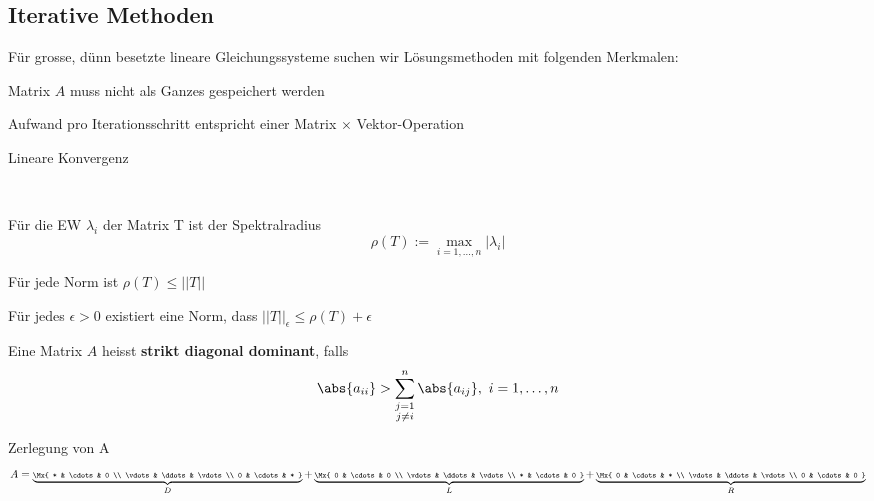 	\subsection{Iterative Methoden}
		Für grosse, dünn besetzte lineare Gleichungssysteme suchen wir Lösungsmethoden mit folgenden Merkmalen:
		\begin{tightitemize}
			\item Matrix $A$ muss nicht als Ganzes gespeichert werden
			\item Aufwand pro Iterationsschritt entspricht einer Matrix $\times$ Vektor-Operation
			\item Lineare Konvergenz
		\end{tightitemize}

		~

		\begin{definition}
			Für die EW $\lambda_i$ der Matrix T ist der Spektralradius
			\[
				\rho(T) := \underset{i = 1, \dots , n}\max{|\lambda_i|}
			\]

			\begin{tightenumerate}
				\item Für jede Norm ist $\rho(T) \leq ||T||$
				\item Für jedes $\epsilon > 0$ existiert eine Norm, dass $||T||_\epsilon \leq \rho(T) + \epsilon$
			\end{tightenumerate}
		\end{definition}

		\begin{definition}
			Eine Matrix $A$ heisst \textbf{strikt diagonal dominant}, falls
			\[
				\abs{a_{ii}} > \sum_{\substack{
					j=1 \\ j \neq i
				}}^n \abs{a_{ij}}, \ i = 1,\dots,n
			\]
		\end{definition}

		\begin{notation}
			Zerlegung von A
			\[
				A = \scriptsize\underbrace{
					\Mx{
						* & \cdots & 0 \\
						\vdots & \ddots & \vdots \\
						0 & \cdots & *
					}
				}_{D} + \underbrace{
					\Mx{
						0 & \cdots & 0 \\
						\vdots & \ddots & \vdots \\
						* & \cdots & 0
					}
				}_{L} + \underbrace{
					\Mx{
						0 & \cdots & * \\
						\vdots & \ddots & \vdots \\
						0 & \cdots & 0
					}
				}_{R}
			\]
		\end{notation}

